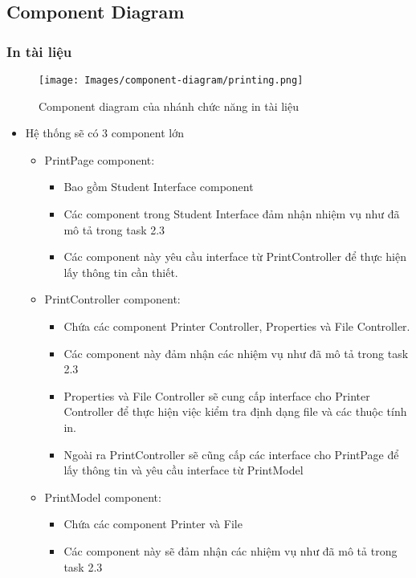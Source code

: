 \newpage
\subsection{Component Diagram}
\subsubsection{In tài liệu}
\begin{figure}[H]
    \centering
    \texttt{[image: Images/component-diagram/printing.png]}
    \vspace{0.1cm}
    \caption{Component diagram của nhánh chức năng in tài liệu}
\end{figure}
\begin{itemize}
    \item Hệ thống sẽ có 3 component lớn
    \begin{itemize}
        \item PrintPage component:
        \begin{itemize}
            \item Bao gồm Student Interface component
            \item Các component trong Student Interface đảm nhận nhiệm vụ như đã mô tả trong task 2.3
            \item Các component này yêu cầu interface từ PrintController để thực hiện lấy thông tin cần thiết.
        \end{itemize}
        \item PrintController component:
        \begin{itemize}
            \item Chứa các component Printer Controller, Properties và File Controller.
            \item Các component này đảm nhận các nhiệm vụ như đã mô tả trong task 2.3
            \item Properties và File Controller sẽ cung cấp interface cho Printer Controller để thực hiện việc kiểm tra định dạng file và các thuộc tính in.
            \item Ngoài ra PrintController sẽ cũng cấp các interface cho PrintPage để lấy thông tin và yêu cầu interface từ PrintModel
        \end{itemize}
        \item PrintModel component:
        \begin{itemize}
            \item Chứa các component Printer và File
            \item Các component này sẽ đảm nhận các nhiệm vụ như đã mô tả trong task 2.3

\end{itemize}
\end{itemize}
\end{itemize}
